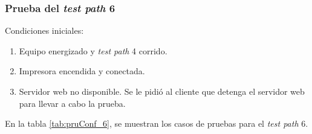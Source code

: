 \pagebreak

\subsubsection{Prueba del \textit{test path} 6}
\label{subsubsec:pruConf_6}

Condiciones iniciales: 

\begin{enumerate}
	\item Equipo energizado y \textit{test path} 4 corrido.
	\item Impresora encendida y conectada.
	\item Servidor web no disponible. Se le pidió al cliente que detenga el servidor web para llevar a cabo la prueba.
\end{enumerate}

En la tabla \ref{tab:pruConf_6}, se muestran los casos de pruebas para el \textit{test path} 6.

